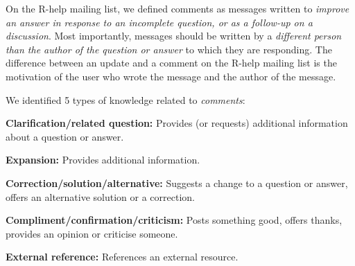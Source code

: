 \documentclass{sig-alternate-05-2015}
\begin{document}
	On the R-help mailing list, we defined comments as messages written to \emph{improve an answer in response to an incomplete question, or as a follow-up on a discussion}.
	Most importantly, messages should be written by a \emph{different person than the author of the question or answer} to which they are responding.
	The difference between an update and a comment on the R-help mailing list is the motivation of the user who wrote the message and the author of the message.



	We identified 5 types of knowledge related to \textit{comments}:
	\begin{packed_enum}
		\item \textbf{Clarification/related question:} Provides (or requests) additional information about a question or answer.
		\item \textbf{Expansion:} Provides additional information.
		\item \textbf{Correction/solution/alternative:} Suggests a change to a question or answer, offers an alternative solution or a correction.
		\item \textbf{Compliment/confirmation/criticism:} Posts something good, offers thanks, provides an opinion or criticise someone.
		\item \textbf{External reference:} References an external resource.
	\end{packed_enum}
\end{document}

